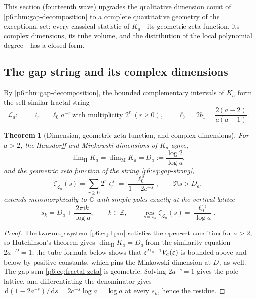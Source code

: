 \documentclass[11pt,oneside]{article}
\numberwithin{equation}{section}
\newtheorem{theorem}{Theorem}[section]
\theoremstyle{definition}
\theoremstyle{remark}
\newcommand{\C}{\mathbb C}
\newcommand{\Z}{\mathbb Z}
\newcommand{\dd}{\,\mathrm d}
\newcommand{\ii}{\mathrm i}
\begin{document}
This section (fourteenth wave) upgrades the qualitative dimension count of
\cref{p6:thm:gap-decomposition} to a complete quantitative geometry of the
exceptional set: every classical statistic of $K_a$---its geometric zeta
function, its complex dimensions, its tube volume, and the distribution of the
local polynomial degree---has a closed form.

\subsection{The gap string and its complex dimensions}

By \cref{p6:thm:gap-decomposition}, the bounded complementary intervals of
$K_a$ form the self-similar fractal string
\begin{equation}\label{p6:eq:gap-string}
 \mathcal L_a:\qquad
 \ell_r=\ell_0a^{-r}
 \ \text{with multiplicity }2^r
 \ (r\ge0),
 \qquad
 \ell_0=2b_1=\frac{2(a-2)}{a(a-1)}.
\end{equation}

\begin{theorem}[Dimension, geometric zeta function, and complex dimensions]
\label{p6:thm:complex-dimensions}
For $a>2$, the Hausdorff and Minkowski dimensions of $K_a$ agree,
\begin{equation}\label{p6:eq:minkowski-dimension}
 \dim_{\mathrm H}K_a=\dim_{\mathrm M}K_a=D_a:=\frac{\log2}{\log a},
\end{equation}
and the geometric zeta function of the string \eqref{p6:eq:gap-string},
\begin{equation}\label{p6:eq:fractal-zeta}
 \zeta_{\mathcal L_a}(s)
 =\sum_{r\ge0}2^r\ell_r^{\,s}
 =\frac{\ell_0^{\,s}}{1-2a^{-s}},
 \qquad\Re s>D_a,
\end{equation}
extends meromorphically to $\C$ with simple poles exactly at the vertical
lattice
\begin{equation}\label{p6:eq:complex-dimensions}
 s_k=D_a+\frac{2\pi\ii k}{\log a},
 \qquad k\in\Z,
 \qquad
 \operatorname*{res}_{s=s_k}\zeta_{\mathcal L_a}(s)
 =\frac{\ell_0^{\,s_k}}{\log a}.
\end{equation}
\end{theorem}

\begin{proof}
The two-map system \eqref{p6:eq:Tpm} satisfies the open-set condition for
$a>2$, so Hutchinson's theorem \cite{p6:hutchinson} gives
$\dim_{\mathrm H}K_a=D_a$ from the similarity equation $2a^{-D}=1$; the tube
formula below shows that $\varepsilon^{D_a-1}V_a(\varepsilon)$ is bounded above and below by
positive constants, which pins the Minkowski dimension at $D_a$ as well.  The
gap sum \eqref{p6:eq:fractal-zeta} is geometric.  Solving $2a^{-s}=1$ gives the
pole lattice, and differentiating the denominator gives
$\dd(1-2a^{-s})/\dd s=2a^{-s}\log a=\log a$ at every $s_k$, hence the residue.
\end{proof}
\end{document}
